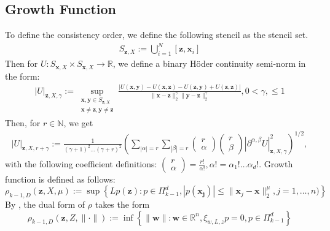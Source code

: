 \documentclass[11pt]{article}
\begin{document}
\pagebreak

\subsection{Growth Function}

To define the consistency order, we define the following stencil as the stencil set.
\begin{align*}
	S_{\bm{z},X} := \bigcup_{i=1}^N[\bm{z}, \bm{x}_i]
\end{align*}
Then for $U: S_{\bm{x},X} \times S_{\bm{x},X} \rightarrow \mathbb{R}$, we define a binary H\"{o}der continuity semi-norm in the form:
\begin{align*}
	|U|_{\bm{z},X,\gamma}:=\sup_{\substack{\bm{x},\bm{y}\in S_{\bm{z},X} \\ \bm{x} \neq \bm{z}, \bm{y} \neq \bm{z}}} \frac{\left| U(\bm{x},\bm{y}) - U(\bm{x},\bm{z}) - U(\bm{z},\bm{y}) + U(\bm{z},\bm{z}) \right|}{\| \bm{x} - \bm{z}\|_2^\gamma \| \bm{y} - \bm{z} \|_2^\gamma} , 0 < \gamma, \le 1
\end{align*}
Then, for $r \in \mathbb{N}$, we get
\begin{align*}
	|U|_{\bm{z},X,r+\gamma}:=\frac{1}{(\gamma+1)^2\hdots (\gamma+r)^2} \left( \sum_{|\alpha|=r} \sum_{|\beta|=r} \begin{pmatrix}	r \\ \alpha \end{pmatrix}
\begin{pmatrix}	r \\ \beta \end{pmatrix} |\partial^{\alpha,\beta}U|_{\bm{z},X,\gamma}^2	 \right)^{1/2},
\end{align*}
with the following coefficient definitions: $\begin{pmatrix}	r \\ \alpha \end{pmatrix} = \frac{r!}{\alpha!}, \alpha!=\alpha_1! \hdots \alpha_d!$.
Growth function is defined as follows:
\begin{equation}
	\rho_{k-1,D}(\bm{z},X,\mu) := \sup \left \{ Lp(\bm{z}): p\in \Pi_{k-1}^d, | p(\bm{x_j}) | \le \| \bm{x}_j - \bm{x} \|_2^\mu, j=1,\hdots,n) \right \}
\end{equation}
By \cite{Davydov2018}, the dual form of $\rho$ takes the form
\begin{equation*}
	\rho_{k-1,D}(\bm{z},Z,\| \cdot \|) := \inf{\left \{ \| \bm{w} \|: \bm{w} \in \mathbb{R}^n, \xi_{w,L,z} p = 0, p \in \Pi_{k-1}^d  \right \}}
\end{equation*}
\end{document}
